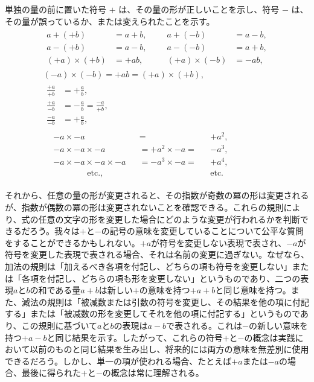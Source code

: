\documentclass[a4paper,11pt,openany]{ltjsbook}
\newcommand{\Add}[1]{#1}
\newcommand{\etc}{\text{etc}}
\begin{document}
単独の量の前に置いた符号 $+$ は、その量の形が正しいことを示し、符号 $-$ は、その量が誤っているか、または変えられたことを示す。
\begin{gather*}
\begin{alignedat}{2}
a + (+b) &= a + b\Add{,} & a + (-b) &= a - b\Add{,} \\
a - (+b) &= a - b\Add{,} & a - (-b) &= a + b\Add{,} \\
(+a) \times  (+b) &= +ab\Add{,}\qquad & (+a) \times  (-b) &= -ab\Add{,}
\end{alignedat} \\
(-a) \times  (-b) = +ab = (+a) \times  (+b)\Add{,} \\
\begin{aligned}
\frac{+a}{+b} &= +\frac{a}{b}\Add{,} \\
\frac{+a}{-b} &= -\frac{a}{b} = \frac{-a}{+b}\Add{,} \\
\frac{-a}{-b} &= +\frac{a}{b}\Add{,}
\end{aligned} \\
\begin{alignedat}{3}
& -a \times  -a          &&= && +a^{2}\Add{,} \\
& -a \times  -a \times  -a &&= +a^{2} \times  -a = &&-a^{3}\Add{,} \\
& -a \times  -a \times  -a \times  -a &&= -a^{3} \times  -a = &&+a^{4}\Add{,} \\
& \qquad\qquad\etc.\Add{,} &&&&\etc.
\end{alignedat}
\end{gather*}

それから、任意の量の形が変更されると、その指数が奇数の冪の形は変更されるが、指数が偶数の冪の形は変更されないことを確認できる。これらの規則により、式の任意の文字の形を変更した場合にどのような変更が行われるかを判断できるだろう。我々は$+$と$-$の記号の意味を変更していることについて公平な質問をすることができるかもしれない。$+a$が符号を変更しない表現で表され、$-a$が符号を変更した表現で表される場合、それは名前の変更に過ぎない。なぜなら、加法の規則は「加えるべき各項を付記し、どちらの項も符号を変更しない」または「各項を付記し、どちらの項も形を変更しない」というものであり、二つの表現$a$と$b$の和である量$a + b$は新しい$+$の意味を持つ$+a + b$と同じ意味を持つ。また、減法の規則は「被减数または引数の符号を変更し、その結果を他の項に付記する」または「被减数の形を変更してそれを他の項に付記する」というものであり、この規則に基づいて$a$と$b$の表現は$a - b$で表される。これは$-$の新しい意味を持つ$+a - b$と同じ結果を示す。したがって、これらの符号$+$と$-$の概念は実践において以前のものと同じ結果を生み出し、将来的には両方の意味を無差別に使用できるだろう。しかし、単一の項が使われる場合、たとえば$+a$または$-a$の場合、最後に得られた$+$と$-$の概念は常に理解される。
\end{document}
